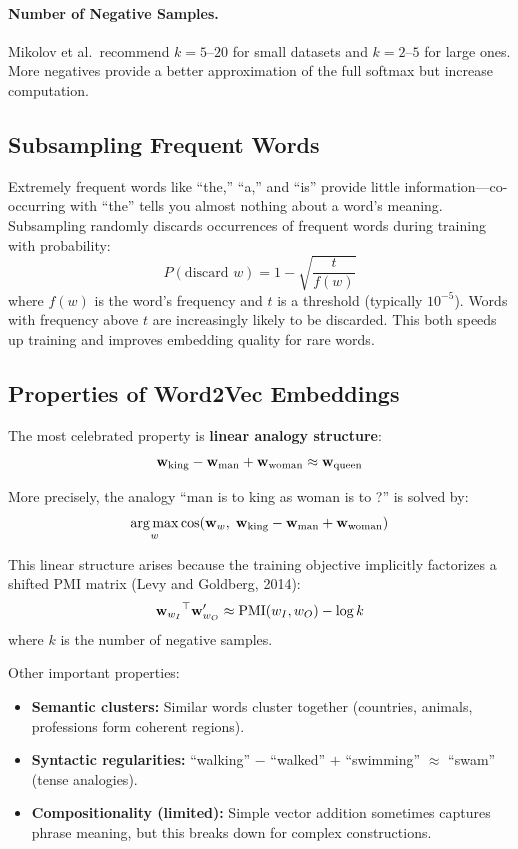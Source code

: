 \paragraph{Number of Negative Samples.}
Mikolov et al.\ recommend $k = 5$--$20$ for small datasets and $k = 2$--$5$
for large ones.  More negatives provide a better approximation of the full
softmax but increase computation.

\subsection{Subsampling Frequent Words}

Extremely frequent words like ``the,'' ``a,'' and ``is'' provide little
information---co-occurring with ``the'' tells you almost nothing about a
word's meaning.  Subsampling randomly discards occurrences of frequent words
during training with probability:
\[
    P(\text{discard } w) = 1 - \sqrt{\frac{t}{f(w)}}
\]
where $f(w)$ is the word's frequency and $t$ is a threshold (typically
$10^{-5}$).  Words with frequency above $t$ are increasingly likely to be
discarded.  This both speeds up training and improves embedding quality for
rare words.

\subsection{Properties of Word2Vec Embeddings}

The most celebrated property is \textbf{linear analogy structure}:
\[
    \mathbf{w}_{\text{king}} - \mathbf{w}_{\text{man}} + \mathbf{w}_{\text{woman}}
    \approx \mathbf{w}_{\text{queen}}
\]

More precisely, the analogy ``man is to king as woman is to ?'' is solved by:
\[
    \operatorname*{arg\,max}_{w} \cos(\mathbf{w}_w, \;\mathbf{w}_{\text{king}} - \mathbf{w}_{\text{man}}
                               + \mathbf{w}_{\text{woman}})
\]

This linear structure arises because the training objective implicitly
factorizes a shifted PMI matrix (Levy and Goldberg, 2014):
\[
    \mathbf{w}_{w_I}{}^\top \mathbf{w}'_{w_O}
    \approx \text{PMI}(w_I, w_O) - \log k
\]
where $k$ is the number of negative samples.

Other important properties:
\begin{itemize}
    \item \textbf{Semantic clusters:} Similar words cluster together
    (countries, animals, professions form coherent regions).
    \item \textbf{Syntactic regularities:} ``walking'' $-$ ``walked'' $+$
    ``swimming'' $\approx$ ``swam'' (tense analogies).
    \item \textbf{Compositionality (limited):} Simple vector addition
    sometimes captures phrase meaning, but this breaks down for complex
    constructions.
\end{itemize}


